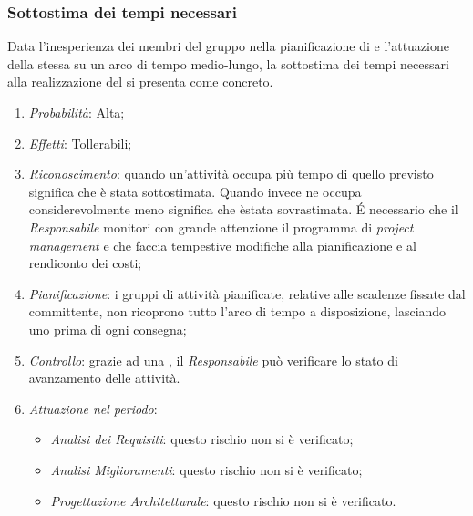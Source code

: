 \subsubsection{Sottostima dei tempi necessari}
Data l'inesperienza dei membri del gruppo nella pianificazione di  e l'attuazione della stessa su un arco di tempo medio-lungo, la sottostima dei tempi necessari alla realizzazione del  si presenta come  concreto.
\begin{enumerate}
\item \textit{Probabilit\`a}: Alta;
\item \textit{Effetti}: Tollerabili;
\item \textit{Riconoscimento}: quando un’attività occupa più tempo di quello previsto significa che è stata sottostimata. Quando invece ne occupa considerevolmente meno significa che èstata sovrastimata. É necessario che il \textit{Responsabile} monitori con grande attenzione il programma di \textit{project management} e che faccia tempestive modifiche alla pianificazione e al rendiconto dei costi;
\item \textit{Pianificazione}: i gruppi di attivit\`a pianificate, relative alle scadenze fissate dal committente, non ricoprono tutto l'arco di tempo a disposizione, lasciando uno  prima di ogni consegna;
\item \textit{Controllo}: grazie ad una , il \textit{Responsabile} pu\`o verificare lo stato di avanzamento delle attivit\`a.
\item \textit{Attuazione nel periodo}: 
	\begin{itemize}
	\item \textit{Analisi dei Requisiti}: questo rischio non si è verificato;
	\item \textit{Analisi Miglioramenti}: questo rischio non si è verificato;
	\item \textit{Progettazione Architetturale}: questo rischio non si è verificato.
	\end{itemize}
\end{enumerate}

